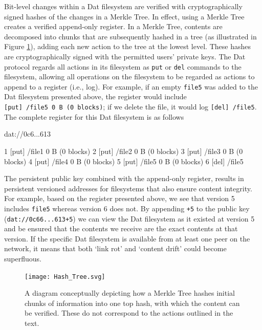 \documentclass[publications,article,submit,moreauthors,pdftex,10pt,a4paper]{Definitions/mdpi}
\newenvironment{Shaded}{\begin{snugshade}}{\end{snugshade}}
\newcommand{\ExtensionTok}[1]{#1}
\newcommand{\NormalTok}[1]{#1}
\begin{document}
Bit-level changes within a Dat filesystem are verified with
cryptographically signed hashes of the changes in a Merkle Tree. In
effect, using a Merkle Tree creates a verified append-only
register. In a Merkle Tree, contents are decomposed into chunks that
are subsequently hashed in a tree (as illustrated in Figure
\ref{fig:datcom-fig2}), adding each new action to the tree at the
lowest level. These hashes are cryptographically signed with the
permitted users' private keys. The Dat protocol regards all actions in
its filesystem as \texttt{put} or \texttt{del} commands to the
filesystem, allowing all operations on the filesystem to be regarded
as actions to append to a register (i.e., log).  For example, if an
empty \texttt{file5} was added to the Dat filesystem presented above,
the register would include
\texttt{{[}put{]}\ /file5\ 0\ B\ (0\ blocks)}; if we delete the file,
it would log \texttt{{[}del{]}\ /file5}. The complete register for
this Dat filesystem is as follows

\begin{Shaded}
\begin{Highlighting}[]
\ExtensionTok{dat}\NormalTok{://0c6...613}

\ExtensionTok{1}\NormalTok{ [put] /file1 0 B (0 blocks)}
\ExtensionTok{2}\NormalTok{ [put] /file2 0 B (0 blocks)}
\ExtensionTok{3}\NormalTok{ [put] /file3 0 B (0 blocks)}
\ExtensionTok{4}\NormalTok{ [put] /file4 0 B (0 blocks)}
\ExtensionTok{5}\NormalTok{ [put] /file5 0 B (0 blocks)}
\ExtensionTok{6}\NormalTok{ [del] /file5}
\end{Highlighting}
\end{Shaded}

The persistent public key combined with the append-only register,
results in persistent versioned addresses for filesystems that also
ensure content integrity. For example, based on the register presented
above, we see that version 5 includes \texttt{file5} whereas version 6
does not. By appending \texttt{+5} to the public key
(\texttt{dat://0c66...613+5}) we can view the Dat filesystem as it
existed at version 5 and be ensured that the contents we receive are
the exact contents at that version. If the specific Dat filesystem is
available from at least one peer on the network, it means that both
`link rot' and `content drift'
\citep{doi:10.1371/journal.pone.0115253,
  doi:10.1371/journal.pone.0167475} could become superfluous.

\begin{figure}[!h]

{\centering \texttt{[image: Hash\_Tree.svg]} 

}

\caption{A diagram conceptually depicting how a Merkle Tree hashes
  initial chunks of information into one top hash, with which the
  content can be verified. These do not correspond to the actions
  outlined in the text.}\label{fig:datcom-fig2}
\end{figure}
\end{document}
